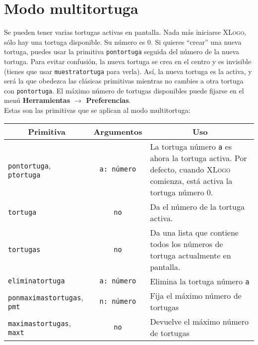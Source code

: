 \chapter{Modo multitortuga}
   \label{Modo-multitortuga}

Se pueden tener varias tortugas activas en pantalla. Nada m\'as iniciarse
\textsc{XLogo}, s\'olo hay una tortuga disponible. Su n\'umero es 0.
Si quieres ``crear'' una nueva tortuga, puedes usar la primitiva
\texttt{pontortuga} 
seguida del n\'umero de la nueva tortuga. Para evitar confusi\'on, la
nueva tortuga se crea en el centro y es invisible (tienes que usar
\texttt{muestratortuga} 
para verla). As\'i, la nueva tortuga es la activa, y ser\'a la que obedezca
las cl\'asicas primitivas mientras no cambies a otra tortuga con
\texttt{pontortuga}. El m\'aximo n\'umero de tortugas disponibles puede
fijarse en el men\'u \textbf{Herramientas $\rightarrow$ Preferencias}. \\

Estas son las primitivas que se aplican al modo multitortuga:
\begin{center} \begin{longtable}{|m{3cm}|c|m{9cm}|} \hline 
   \multicolumn{1}{|c|}{\textbf{Primitiva}} &
      \multicolumn{1}{c|}{\textbf{Argumentos}} &
         \multicolumn{1}{c|}{\textbf{Uso}} \\ \endhead \hline 
   \texttt{pontortuga}, \index{pontortuga@\texttt{pontortuga}}
      \texttt{ptortuga}\index{ptortuga@\texttt{ptortuga}} & 
         \texttt{a: n\'umero} &
        La tortuga n\'umero \texttt{a} es ahora la tortuga activa. Por defecto,
        cuando \textsc{XLogo} comienza, est\'a activa la tortuga n\'umero
        0.\\ \hline 
   \texttt{tortuga} \index{tortuga@\texttt{tortuga}} & \texttt{no} &
        Da el n\'umero de la tortuga activa. \\ \hline 
   \texttt{tortugas} \index{tortugas@\texttt{tortugas}} & \texttt{no} &
        Da una lista que contiene todos los n\'umeros de tortuga actualmente
        en pantalla. \\ \hline 
   \texttt{eliminatortuga} \index{eliminatortuga@\texttt{eliminatortuga}} &
       \texttt{a: n\'umero} &
        Elimina la tortuga n\'umero \texttt{a} \\ \hline
   \texttt{ponmaximastortugas},
       \index{ponmaximastortugas@\texttt{ponmaximastortugas}}
   \texttt{pmt} \index{pmt@\texttt{pmt}} &\texttt{n: n\'umero} &
        Fija el m\'aximo n\'umero de tortugas \\ \hline 
   \texttt{maximastortugas}, \index{maximastortugas@\texttt{maximastortugas}}
   \texttt{maxt} \index{maxt@\texttt{maxt}} & \texttt{no} &
        Devuelve el m\'aximo n\'umero de tortugas \\ \hline 
\end{longtable} \end{center}